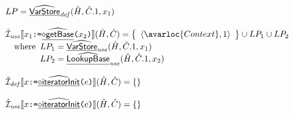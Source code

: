 \[\begin{array}{l}
{    LP = \ahf{VarStore}_{\it def}(\hat{H},\hat{C}.1,x_1)
  }
  \\\\
  \aI_{\it use}\lbr x_1 \TT{:=} \ahfi{getBase}\TT{(}x_2\TT{)} \rbr(\hat{H},\hat{C})
  = \set{\langle \avarloc{Context}, 1\rangle} \cup LP_1 \cup LP_2\\
  \quad\wherec{
    LP_1 = \ahf{VarStore}_{\it use}(\hat{H},\hat{C}.1,x_1)\\
    LP_2 = \ahf{LookupBase}_{\it use}(\hat{H},\hat{C}.1,x_2)
  }
  \\\\
  \aI_{\it def}\lbr x \TT{:=} \ahfi{iteratorInit}\TT{(}e\TT{)} \rbr(\hat{H},\hat{C})
  = \set{}
  \\\\
  \aI_{\it use}\lbr x \TT{:=} \ahfi{iteratorInit}\TT{(}e\TT{)} \rbr(\hat{H},\hat{C})
  = \set{}
\end{array}
\]
